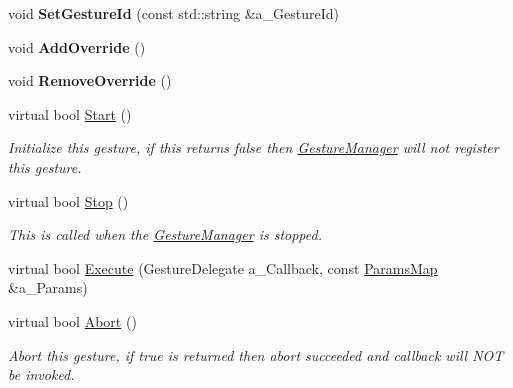 \begin{DoxyCompactItemize}
\item 
\mbox{\label{class_i_gesture_ae3ccbc6bef0d4d8728c106d25bbe5d0c}} 
void {\bfseries Set\+Gesture\+Id} (const std\+::string \&a\+\_\+\+Gesture\+Id)
\item 
\mbox{\label{class_i_gesture_accdcc472f29dfe53163eb7dcd4cba185}} 
void {\bfseries Add\+Override} ()
\item 
\mbox{\label{class_i_gesture_a8f246e2ba518a5e8ecd0ee0688cff8b8}} 
void {\bfseries Remove\+Override} ()
\item 
\mbox{\label{class_i_gesture_a26334c27f6df0a78e47bdbdec0564e17}} 
virtual bool \hyperlink{class_i_gesture_a26334c27f6df0a78e47bdbdec0564e17}{Start} ()
\begin{DoxyCompactList}\small\item\em Initialize this gesture, if this returns false then \hyperlink{class_gesture_manager}{Gesture\+Manager} will not register this gesture. \end{DoxyCompactList}\item 
\mbox{\label{class_i_gesture_a954a15b343ff62c46fb1081f201079e1}} 
virtual bool \hyperlink{class_i_gesture_a954a15b343ff62c46fb1081f201079e1}{Stop} ()
\begin{DoxyCompactList}\small\item\em This is called when the \hyperlink{class_gesture_manager}{Gesture\+Manager} is stopped. \end{DoxyCompactList}\item 
virtual bool \hyperlink{class_i_gesture_aa48e38eda852843cab78c22dabfe7371}{Execute} (Gesture\+Delegate a\+\_\+\+Callback, const \hyperlink{class_params_map}{Params\+Map} \&a\+\_\+\+Params)
\item 
\mbox{\label{class_i_gesture_a83920e1b8e53045f629464cbec2288bd}} 
virtual bool \hyperlink{class_i_gesture_a83920e1b8e53045f629464cbec2288bd}{Abort} ()
\begin{DoxyCompactList}\small\item\em Abort this gesture, if true is returned then abort succeeded and callback will N\+OT be invoked. \end{DoxyCompactList}\end{DoxyCompactItemize}
